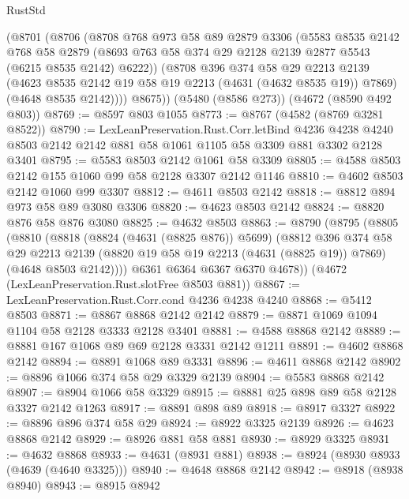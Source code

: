 \begin{lexlean}{RustStd}
\begin{coremodule}
{\begin{coremodule}
{{{{{{{{{{{{{{{{      (@8701
        (@8706
          (@8708
            @768
            @973
            @58
            @89
            @2879
            @3306
            (@5583
              @8535
              @2142
              @768
              @58
              @2879
              (@8693 @763 @58 @374 @29 @2128 @2139 @2877 @5543 (@6215 @8535 @2142) @6222))
            (@8708
              @396
              @374
              @58
              @29
              @2213
              @2139
              (@4623 @8535 @2142 @19 @58 @19 @2213 (@4631 (@4632 @8535 @19)) @7869)
              (@4648 @8535 @2142))))
        @8675))
    (@5480 (@8586 @273))
    (@4672 (@8590 @492 @803))
@8769 := @8597 @803 @1055
@8773 := @8767 (@4582 (@8769 @3281 @8522))
@8790 := LexLeanPreservation.Rust.Corr.letBind
    @4236
    @4238
    @4240
    @8503
    @2142
    @2142
    @881
    @58
    @1061
    @1105
    @58
    @3309
    @881
    @3302
    @2128
    @3401
@8795 := @5583 @8503 @2142 @1061 @58 @3309
@8805 := @4588 @8503 @2142 @155 @1060 @99 @58 @2128 @3307 @2142 @1146
@8810 := @4602 @8503 @2142 @1060 @99 @3307
@8812 := @4611 @8503 @2142
@8818 := @8812 @894 @973 @58 @89 @3080 @3306
@8820 := @4623 @8503 @2142
@8824 := @8820 @876 @58 @876 @3080
@8825 := @4632 @8503
@8863 := @8790
    (@8795
      (@8805
        (@8810
          (@8818
            (@8824 (@4631 (@8825 @876)) @5699)
            (@8812
              @396
              @374
              @58
              @29
              @2213
              @2139
              (@8820 @19 @58 @19 @2213 (@4631 (@8825 @19)) @7869)
              (@4648 @8503 @2142))))
        @6361
        @6364
        @6367
        @6370
        @4678))
    (@4672 (LexLeanPreservation.Rust.slotFree @8503 @881))
@8867 := LexLeanPreservation.Rust.Corr.cond @4236 @4238 @4240
@8868 := @5412 @8503
@8871 := @8867 @8868 @2142 @2142
@8879 := @8871 @1069 @1094 @1104 @58 @2128 @3333 @2128 @3401
@8881 := @4588 @8868 @2142
@8889 := @8881 @167 @1068 @89 @69 @2128 @3331 @2142 @1211
@8891 := @4602 @8868 @2142
@8894 := @8891 @1068 @89 @3331
@8896 := @4611 @8868 @2142
@8902 := @8896 @1066 @374 @58 @29 @3329 @2139
@8904 := @5583 @8868 @2142
@8907 := @8904 @1066 @58 @3329
@8915 := @8881 @25 @898 @89 @58 @2128 @3327 @2142 @1263
@8917 := @8891 @898 @89
@8918 := @8917 @3327
@8922 := @8896 @896 @374 @58 @29
@8924 := @8922 @3325 @2139
@8926 := @4623 @8868 @2142
@8929 := @8926 @881 @58 @881
@8930 := @8929 @3325
@8931 := @4632 @8868
@8933 := @4631 (@8931 @881)
@8938 := @8924 (@8930 @8933 (@4639 (@4640 @3325)))
@8940 := @4648 @8868 @2142
@8942 := @8918 (@8938 @8940)
@8943 := @8915 @8942
}}}}}}}}}}}}}}}}
\end{coremodule}}
\end{coremodule}
\end{lexlean}
